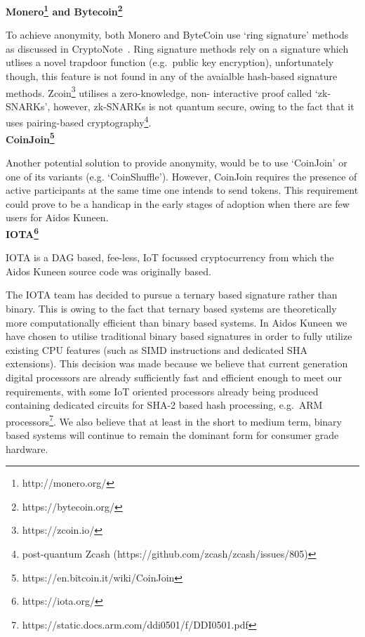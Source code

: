 \documentclass[a4paper,10pt,twocolumn]{article}
\begin{document}
{\bf Monero\footnote{http://monero.org/} and Bytecoin\footnote{https://bytecoin.org/}}

To achieve anonymity, both Monero and ByteCoin use `ring signature' methods as discussed in CryptoNote~\cite{ringsig}. Ring signature 
methods rely on a signature which utlises a novel trapdoor function (e.g.\ public key encryption), unfortunately though, this feature is 
not found in any of the avaialble hash-based signature methods. Zcoin\footnote{https://zcoin.io/} utilises a zero-knowledge, non-
interactive proof called `zk-SNARKs', however, zk-SNARKs is not quantum secure, owing to the fact that it uses pairing-based 
cryptography\footnote{post-quantum Zcash (https://github.com/zcash/zcash/issues/805)}. 
\\

\noindent
{\bf CoinJoin\footnote{https://en.bitcoin.it/wiki/CoinJoin}}


Another potential solution to provide anonymity, would be to use `CoinJoin' or one of its variants (e.g. `CoinShuffle'). However, 
CoinJoin requires the presence of active participants at the same time one intends to send tokens. This requirement could prove to be a 
handicap in the early stages of adoption when there are few users for Aidos Kuneen. 
\\

\noindent
{\bf IOTA\footnote{https://iota.org/}}

IOTA is a DAG based, fee-less, IoT focussed cryptocurrency from which the Aidos Kuneen source code was originally based. 

The IOTA team has decided to pursue a ternary based signature rather than binary. This is owing to the fact that ternary based 
systems are theoretically more computationally efficient than binary based systems. In Aidos Kuneen we have chosen to utilise 
traditional binary based signatures in order to fully utilize existing CPU features (such as SIMD instructions and dedicated SHA 
extensions). This decision was made because we believe that current generation digital processors are already sufficiently fast and 
efficient enough to meet our requirements, with some IoT oriented processors already being produced containing dedicated circuits for 
SHA-2 based hash processing, e.g.~ARM processors\footnote{https://static.docs.arm.com/ddi0501/f/DDI0501.pdf}. We also believe that at 
least in the short to medium term, binary based systems will continue to remain the dominant form for consumer grade hardware.
\end{document}
